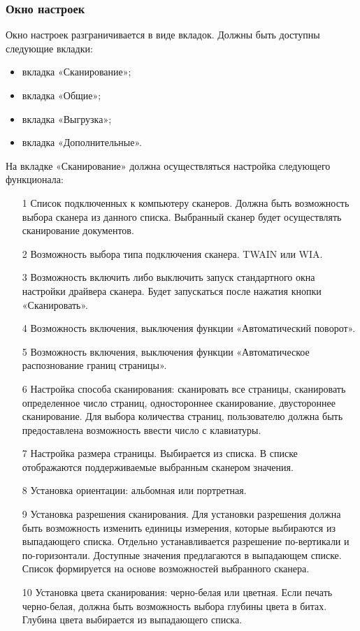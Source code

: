 \subsubsection{Окно настроек}
\label{sub:requirements:func_rec:settings_window}


Окно настроек разграничивается в виде вкладок. Должны быть доступны следующие вкладки:
\begin{itemize}
	\item вкладка «Сканирование»;
	\item вкладка «Общие»;
	\item вкладка «Выгрузка»;
	\item вкладка «Дополнительные».
\end{itemize}

На вкладке «Сканирование» должна осуществляться настройка следующего функционала:
\begin{enumerate}
	\item[1] Список подключенных к компьютеру сканеров. Должна быть возможность выбора сканера из данного списка. Выбранный сканер будет осуществлять сканирование документов.
	\item[2] Возможность выбора типа подключения сканера. TWAIN или WIA.
	\item[3] Возможность включить либо выключить запуск стандартного окна настройки драйвера сканера. Будет запускаться после нажатия кнопки «Сканировать».
	\item[4] Возможность включения, выключения функции «Автоматический поворот».
	\item[5] Возможность включения, выключения функции «Автоматическое распознование границ страницы».
	\item[6] Настройка способа сканирования: сканировать все страницы, сканировать определенное число страниц, одностороннее сканирование, двустороннее сканирование. Для выбора количества страниц, пользователю должна быть предоставлена возможность ввести число с клавиатуры.
	\item[7] Настройка размера страницы. Выбирается из списка. В списке отображаются поддерживаемые выбранным сканером значения.
	\item[8] Установка ориентации: альбомная или портретная.
	\item[9] Установка разрешения сканирования. Для установки разрешения должна быть возможность изменить единицы измерения, которые выбираются из выпадающего списка. Отдельно устанавливается разрешение по-вертикали и по-горизонтали. Доступные значения предлагаются в выпадающем списке. Список формируется на основе возможностей выбранного сканера.
	\item[10] Установка цвета сканирования: черно-белая или цветная. Если печать черно-белая, должна быть возможность выбора глубины цвета в битах. Глубина цвета выбирается из выпадающего списка.
\end{enumerate} 

